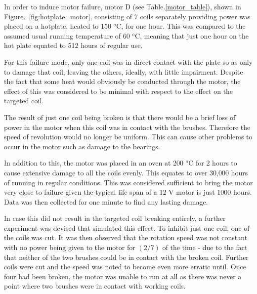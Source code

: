 
In order to induce motor failure, motor D (see Table.\ref{motor_table}), shown in Figure.~\ref{fig:hotplate_motor}, consisting of 7 coils separately providing power was placed on a hotplate, heated to 150 $^o$C, for one hour. This was compared to the assumed usual running temperature of 60 $^o$C, meaning that just one hour on the hot plate equated to 512 hours of regular use.

For this failure mode, only one coil was in direct contact with the plate so as only to damage that coil, leaving the others, ideally, with little impairment. Despite the fact that some heat would obviously be conducted through the motor, the effect of this was considered to be minimal with respect to the effect on the targeted coil.

The result of just one coil being broken is that there would be a brief loss of power in the motor when this coil was in contact with the brushes. Therefore the speed of revolution would no longer be uniform. This can cause other problems to occur in the motor such as damage to the bearings. 

In addition to this, the motor was placed in an oven at 200 $^o$C for 2 hours to cause extensive damage to all the coils evenly. This equates to over 30,000 hours of running in regular conditions. This was considered sufficient to bring the motor very close to failure given the typical life span of a 12 V motor is just 1000 hours. %
Data was then collected for one minute to find any lasting damage.

In case this did not result in the targeted coil breaking entirely, a further experiment was devised that simulated this effect. To inhibit just one coil, one of the coils was cut. It was then observed that the rotation speed was not constant with no power being given to the motor for $({2}/{7})$ of the time - due to the fact that neither of the two brushes could be in contact with the broken coil. Further coils were cut and the speed was noted to become even more erratic until. Once four had been broken, the motor was unable to run at all as there was never a point where two brushes were in contact with working coils.


